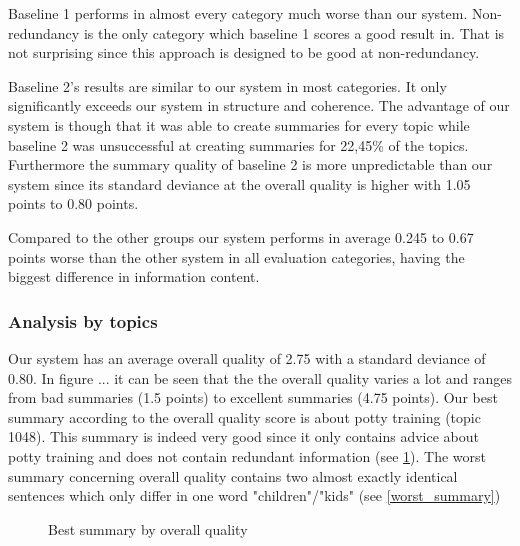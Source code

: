 Baseline 1 performs in almost every category much worse than our system. Non-redundancy is the only category which baseline 1 scores a good result in. That is not surprising since this approach is designed to be good at non-redundancy.

Baseline 2's results are similar to our system in most categories. It only significantly exceeds our system in structure and coherence. The advantage of our system is though that it was able to create summaries for every topic while baseline 2 was unsuccessful at creating summaries for 22,45\% of the topics. Furthermore the summary quality of baseline 2 is more unpredictable than our system since its standard deviance at the overall quality is higher with 1.05 points to 0.80 points.

Compared to the other groups our system performs in average 0.245 to 0.67 points worse than the other system in all evaluation  categories, having the biggest difference in information content.  


\subsubsection{Analysis by topics}

Our system has an average overall quality of 2.75 with a standard deviance of 0.80. In figure ... it can be seen that the the overall quality varies a lot and ranges from bad summaries (1.5 points) to excellent summaries (4.75 points). Our best summary according to the overall quality score is about potty training (topic 1048). This summary is indeed very good since it only contains advice about potty training and does not contain redundant information (see \ref{best_summary}). The worst summary concerning overall quality contains two almost exactly identical sentences which only differ in one word "children"/"kids" (see \ref{worst_summary})

\begin{figure}
	\caption{Best summary by overall quality}
	\label{best_summary}
	\noindent{}	
\end{figure}


